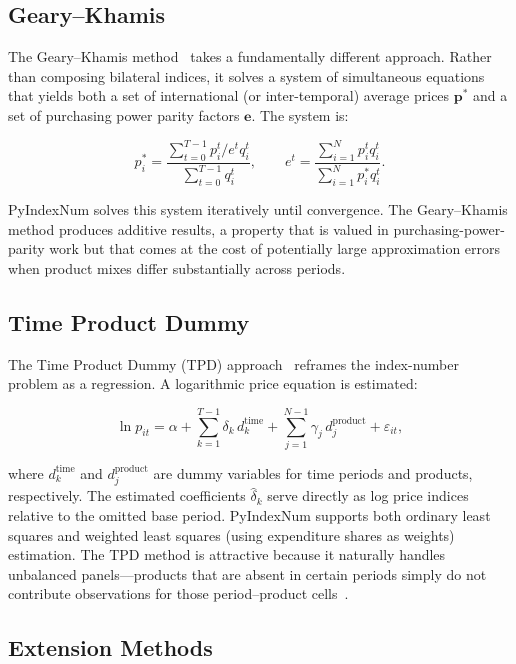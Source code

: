 \documentclass[12pt,a4paper]{article}
\begin{document}
\subsection{Geary--Khamis}

The Geary--Khamis method~\autocite{geary1958note, khamis1972new} takes a fundamentally different approach. Rather than composing bilateral indices, it solves a system of simultaneous equations that yields both a set of international (or inter-temporal) average prices $\mathbf{p}^*$ and a set of purchasing power parity factors $\mathbf{e}$. The system is:

\[
  p_i^{*} = \frac{\sum_{t=0}^{T-1} p_i^t / e^t q_i^t}{\sum_{t=0}^{T-1} q_i^t}, \qquad
  e^t = \frac{\sum_{i=1}^{N} p_i^t q_i^t}{\sum_{i=1}^{N} p_i^{*} q_i^t}.
\]

PyIndexNum solves this system iteratively until convergence. The Geary--Khamis method produces additive results, a property that is valued in purchasing-power-parity work but that comes at the cost of potentially large approximation errors when product mixes differ substantially across periods.

\subsection{Time Product Dummy}

The Time Product Dummy (TPD) approach~\autocite{summers1973international, diewert2005wcpd} reframes the index-number problem as a regression. A logarithmic price equation is estimated:

\[
  \ln p_{it} = \alpha + \sum_{k=1}^{T-1} \delta_k \, d_k^{\mathrm{time}} + \sum_{j=1}^{N-1} \gamma_j \, d_j^{\mathrm{product}} + \varepsilon_{it},
\]

where $d_k^{\mathrm{time}}$ and $d_j^{\mathrm{product}}$ are dummy variables for time periods and products, respectively. The estimated coefficients $\hat{\delta}_k$ serve directly as log price indices relative to the omitted base period. PyIndexNum supports both ordinary least squares and weighted least squares (using expenditure shares as weights) estimation. The TPD method is attractive because it naturally handles unbalanced panels---products that are absent in certain periods simply do not contribute observations for those period--product cells~\autocite{dehaan2020tpd}.

\subsection{Extension Methods}
\end{document}
